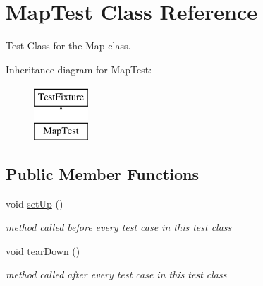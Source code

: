 \hypertarget{class_map_test}{}\section{Map\+Test Class Reference}
\label{class_map_test}


Test Class for the Map class.  


Inheritance diagram for Map\+Test\+:\begin{figure}[H]
\begin{center}
\leavevmode
\includegraphics[height=2.000000cm]{class_map_test}
\end{center}
\end{figure}
\subsection*{Public Member Functions}
\begin{DoxyCompactItemize}
\item 
\hypertarget{class_map_test_a548501698e49e4de388482c502962cfd}{}\label{class_map_test_a548501698e49e4de388482c502962cfd} 
void \hyperlink{class_map_test_a548501698e49e4de388482c502962cfd}{set\+Up} ()
\begin{DoxyCompactList}\small\item\em method called before every test case in this test class \end{DoxyCompactList}\item 
\hypertarget{class_map_test_a1a75bd7462d39afc6f5039fa36252cca}{}\label{class_map_test_a1a75bd7462d39afc6f5039fa36252cca} 
void \hyperlink{class_map_test_a1a75bd7462d39afc6f5039fa36252cca}{tear\+Down} ()
\begin{DoxyCompactList}\small\item\em method called after every test case in this test class \end{DoxyCompactList}\end{DoxyCompactItemize}
